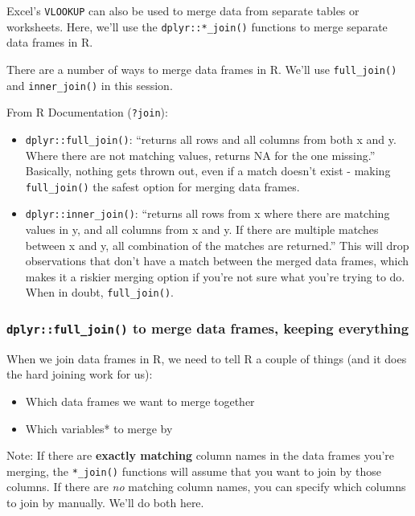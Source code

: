 \documentclass[]{book}
\providecommand{\tightlist}{%
  \setlength{\itemsep}{0pt}\setlength{\parskip}{0pt}}
\begin{document}
Excel's \texttt{VLOOKUP} can also be used to merge data from separate tables or worksheets. Here, we'll use the \texttt{dplyr::*\_join()} functions to merge separate data frames in R.

There are a number of ways to merge data frames in R. We'll use \texttt{full\_join()} and \texttt{inner\_join()} in this session.

From R Documentation (\texttt{?join}):

\begin{itemize}
\tightlist
\item
  \texttt{dplyr::full\_join()}: ``returns all rows and all columns from both x and y. Where there are not matching values, returns NA for the one missing.'' Basically, nothing gets thrown out, even if a match doesn't exist - making \texttt{full\_join()} the safest option for merging data frames.
\item
  \texttt{dplyr::inner\_join()}: ``returns all rows from x where there are matching values in y, and all columns from x and y. If there are multiple matches between x and y, all combination of the matches are returned.'' This will drop observations that don't have a match between the merged data frames, which makes it a riskier merging option if you're not sure what you're trying to do. When in doubt, \texttt{full\_join()}.
\end{itemize}

\hypertarget{dplyrfull_join-to-merge-data-frames-keeping-everything}{%
\subsubsection{\texorpdfstring{\texttt{dplyr::full\_join()} to merge data frames, keeping everything}{dplyr::full\_join() to merge data frames, keeping everything}}\label{dplyrfull_join-to-merge-data-frames-keeping-everything}}

When we join data frames in R, we need to tell R a couple of things (and it does the hard joining work for us):

\begin{itemize}
\tightlist
\item
  Which data frames we want to merge together
\item
  Which variables* to merge by
\end{itemize}

Note: If there are \textbf{exactly matching} column names in the data frames you're merging, the \texttt{*\_join()} functions will assume that you want to join by those columns. If there are \emph{no} matching column names, you can specify which columns to join by manually. We'll do both here.
\end{document}
